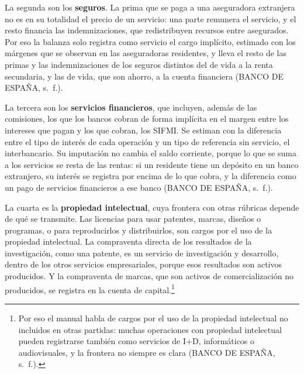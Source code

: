\documentclass[10pt,a4paper]{article}
\begin{document}
La segunda son los \textbf{seguros}. La prima que se paga a una aseguradora extranjera no es en su totalidad el precio de un servicio: una parte remunera el servicio, y el resto financia las indemnizaciones, que redistribuyen recursos entre asegurados. Por eso la balanza solo registra como servicio el cargo implícito, estimado con los márgenes que se observan en las aseguradoras residentes, y lleva el resto de las primas y las indemnizaciones de los seguros distintos del de vida a la renta secundaria, y las de vida, que son ahorro, a la cuenta financiera (BANCO DE ESPAÑA, s.~f.).

La tercera son los \textbf{servicios financieros}, que incluyen, además de las comisiones, los que los bancos cobran de forma implícita en el margen entre los intereses que pagan y los que cobran, los SIFMI. Se estiman con la diferencia entre el tipo de interés de cada operación y un tipo de referencia sin servicio, el interbancario. Su imputación no cambia el saldo corriente, porque lo que se suma a los servicios se resta de las rentas: si un residente tiene un depósito en un banco extranjero, su interés se registra por encima de lo que cobra, y la diferencia como un pago de servicios financieros a ese banco (BANCO DE ESPAÑA, s.~f.).

La cuarta es la \textbf{propiedad intelectual}, cuya frontera con otras rúbricas depende de qué se transmite. Las licencias para usar patentes, marcas, diseños o programas, o para reproducirlos y distribuirlos, son cargos por el uso de la propiedad intelectual. La compraventa directa de los resultados de la investigación, como una patente, es un servicio de investigación y desarrollo, dentro de los otros servicios empresariales, porque esos resultados son activos producidos. Y la compraventa de marcas, que son activos de comercialización no producidos, se registra en la cuenta de capital.\footnote{%
    Por eso el manual habla de cargos por el uso de la propiedad intelectual no incluidos en otras partidas: muchas operaciones con propiedad intelectual pueden registrarse también como servicios de I+D, informáticos o audiovisuales, y la frontera no siempre es clara (BANCO DE ESPAÑA, s.~f.).
}
\end{document}
